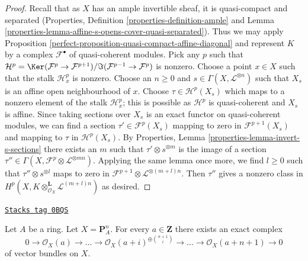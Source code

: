 \begin{proof}

Recall that as $X$ has an ample invertible sheaf, it is quasi-compact
and separated (Properties, Definition \ref{properties-definition-ample} and
Lemma \ref{properties-lemma-affine-s-opens-cover-quasi-separated}).
Thus we may apply
Proposition \ref{perfect-proposition-quasi-compact-affine-diagonal}
and represent $K$ by a complex $\mathcal{F}^\bullet$ of
quasi-coherent modules. Pick any $p$ such that
$\mathcal{H}^p = \Ker(\mathcal{F}^p \to \mathcal{F}^{p + 1})/
\Im(\mathcal{F}^{p - 1} \to \mathcal{F}^p)$ is nonzero.
Choose a point $x \in X$ such that the stalk $\mathcal{H}^p_x$ is
nonzero. Choose an $n \geq 0$ and $s \in \Gamma(X, \mathcal{L}^{\otimes n})$
such that $X_s$ is an affine open neighbourhood of $x$.
Choose $\tau \in \mathcal{H}^p(X_s)$ which maps to a nonzero
element of the stalk $\mathcal{H}^p_x$; this is possible
as $\mathcal{H}^p$ is quasi-coherent and $X_s$ is affine.
Since taking sections over $X_s$ is an exact functor on
quasi-coherent modules, we can find a section $\tau' \in \mathcal{F}^p(X_s)$
mapping to zero in $\mathcal{F}^{p + 1}(X_s)$ and mapping to
$\tau$ in $\mathcal{H}^p(X_s)$. By
Properties, Lemma \ref{properties-lemma-invert-s-sections}
there exists an $m$ such that $\tau' \otimes s^{\otimes m}$
is the image of a section
$\tau'' \in \Gamma(X, \mathcal{F}^p \otimes \mathcal{L}^{\otimes mn})$.
Applying the same lemma once more, we find $l \geq 0$ such that
$\tau'' \otimes s^{\otimes l}$ maps to zero in
$\mathcal{F}^{p + 1} \otimes \mathcal{L}^{\otimes (m + l)n}$.
Then $\tau''$ gives a nonzero class in
$H^p(X, K \otimes^\mathbf{L}_{\mathcal{O}_X} \mathcal{L}^{(m + l)n})$
as desired.
\end{proof}

\begin{lemma}
\label{perfect-lemma-construct-the-next-one}
\href{https://stacks.math.columbia.edu/tag/0BQS}{\texttt{Stacks tag 0BQS}}

Let $A$ be a ring. Let $X = \mathbf{P}^n_A$. For every $a \in \mathbf{Z}$
there exists an exact complex
$$
0 \to \mathcal{O}_X(a) \to \ldots
\to \mathcal{O}_X(a + i)^{\oplus {n + 1 \choose i}} \to
\ldots \to \mathcal{O}_X(a + n + 1) \to 0
$$
of vector bundles on $X$.
\end{lemma}


